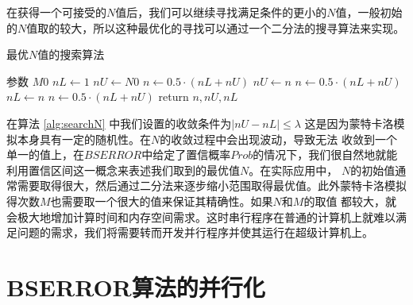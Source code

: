 在获得一个可接受的$N$值后，我们可以继续寻找满足条件的更小的$N$值，一般初始的$N$值取的较大，所以这种最优化的寻找可以通过一个二分法的搜寻算法来实现。
\begin{algorithm}
	\caption{最优$N$值的搜索算法}
	\label{alg:searchN}
	\begin{algorithmic}[1]
		\State 参数 $M0$ 
		 
		\State $nL \gets 1$  
		\State $nU \gets N0$ 
		\State $n \gets 0.5\cdot (nL + nU)$
		 
		\State $nU \gets n$
		\State $n \gets 0.5\cdot(nL + nU)$ 		
		\Else  {}
		\State $nL \gets n$
		\State $n \gets 0.5\cdot(nL + nU)$ 		
		\EndIf
		\EndWhile
		\State return $n, nU, nL$
		\EndProcedure
	\end{algorithmic}
\end{algorithm}
在算法 \ref{alg:searchN} 中我们设置的收敛条件为$|nU - nL| \le \lambda$ 这是因为蒙特卡洛模拟本身具有一定的随机性。在$N$的收敛过程中会出现波动，导致无法
收敛到一个单一的值上，在$BSERROR$中给定了置信概率$Prob$的情况下，我们很自然地就能利用置信区间这一概念来表述我们取到的最优值$N$。在实际应用中，
$N$的初始值通常需要取得很大，然后通过二分法来逐步缩小范围取得最优值。此外蒙特卡洛模拟得次数$M$也需要取一个很大的值来保证其精确性。如果$N$和$M$的取值
都较大，就会极大地增加计算时间和内存空间需求。这时串行程序在普通的计算机上就难以满足问题的需求，我们将需要转而开发并行程序并使其运行在超级计算机上。


\section{BSERROR算法的并行化} %
\label{sec:BSERRORParallel}



